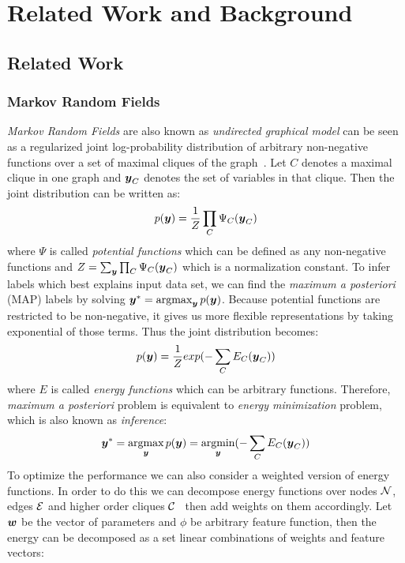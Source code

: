
\chapter{Related Work and Background}
\label{cha:RelatedWorks}

\section{Related Work}
\subsection{Markov Random Fields}
\label{sec:MRF}
\emph{Markov Random Fields} are also known as \emph{undirected
  graphical model} can be seen as a regularized joint
log-probability distribution of arbitrary non-negative functions
over a set of maximal cliques of the
graph~\cite{bishop:2006:PRML}. Let $C$ denotes a maximal clique
in one graph and ${\boldsymbol{y}}_C$ denotes the set of variables in that
clique. Then the joint distribution can be written as:
\begin{align}
  p({\boldsymbol{y}})=\frac{1}{Z}\prod_{C}{\Psi_C({\boldsymbol{y}}_C)}
\end{align}
\noindent where $\Psi$ is called \emph{potential functions} which
can be defined as any non-negative functions and
$Z=\sum_{{\boldsymbol{y}}}\prod_{C}{\Psi_C({\boldsymbol{y}}_C)}$ which is a normalization
constant. To infer labels which best explains input data set, we
can find the \emph{maximum a posteriori} (MAP) labels by solving
${\boldsymbol{y}}^*=\mathop{\textrm{argmax}}_{{\boldsymbol{y}}}p({\boldsymbol{y}})$. Because potential functions are
restricted to be non-negative, it gives us more flexible
representations by taking exponential of those terms. Thus the
joint distribution becomes:
\begin{align}
  p({\boldsymbol{y}})=\frac{1}{Z}exp(-\sum_{C}{E_C({\boldsymbol{y}}_C)})
\end{align}
\noindent where $E$ is called \emph{energy functions} which can be
arbitrary functions. Therefore, \emph{maximum a posteriori}
problem is equivalent to \emph{energy minimization} problem,
which is also known as \emph{inference}:
\begin{align}
  {\boldsymbol{y}}^*=\mathop{\textrm{argmax}}_{{\boldsymbol{y}}}p({\boldsymbol{y}})=\mathop{\textrm{argmin}}_{{\boldsymbol{y}}}(-\sum_{C}{E_C({\boldsymbol{y}}_C)})
\end{align}
To optimize the performance we can also consider a weighted
version of energy functions. In order to do this we can decompose
energy functions over nodes ${\cal N}$, edges ${\cal E}$ and higher order
cliques ${\cal C}$~\cite{Szummer:ECCV08} then add weights on them
accordingly. Let ${\boldsymbol{w}}$ be the vector of parameters and $\phi$ be
arbitrary feature function, then the energy can be decomposed as
a set linear combinations of weights and feature vectors:

